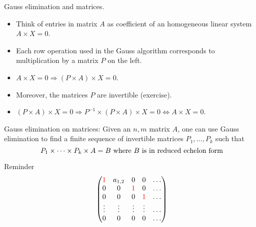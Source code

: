 \documentclass{beamer}
\begin{document}
  \begin{frame}{Gauss elimination and matrices.}
    \begin{itemize}
    \item Think of entries in matrix $A$ as coefficient of an homogeneous linear system $A \times X = 0$.
    \item Each row operation used in the Gauss algorithm corresponds to multiplication by a matrix $P$ on the left.
    \item $A \times X = 0 \Rightarrow (P \times A) \times X = 0$.
    \item Moreover, the matrices $P$ are invertible (exercise).
    \item $(P \times A) \times X = 0 \Rightarrow P^{-1} \times (P \times A) \times X = 0 \Leftrightarrow A \times X = 0$. 
    \end{itemize}
  \end{frame}
  
  \begin{frame}
    \begin{block}{Gauss elimination on matrices:}
      Given an $n,m$ matrix $A$, one can use Gauss elimination to find a finite sequence of invertible matrices $P_1, \dots, P_k$ such that \[P_1 \times \dots \times P_k \times A = B \textnormal{ where } B \textnormal{ is in reduced echelon form}\]
    \end{block}

    \begin{exampleblock}{Reminder}
    \[ \begin{pmatrix}{}
      {\color{red}1}     & a_{1,2}    &  0     & 0   & \dots \\
      0     & 0           & {\color{red}1} &  0       & \dots\\
      0     & 0          &   0   & {\color{red}1} & \dots \\
      \vdots & \vdots     & \vdots      &  \vdots     & \dots\\
      0     &   0          &  0    & 0  & \dots \\
    \end{pmatrix}
    \]
    \end{exampleblock}
  \end{frame}
\end{document}
